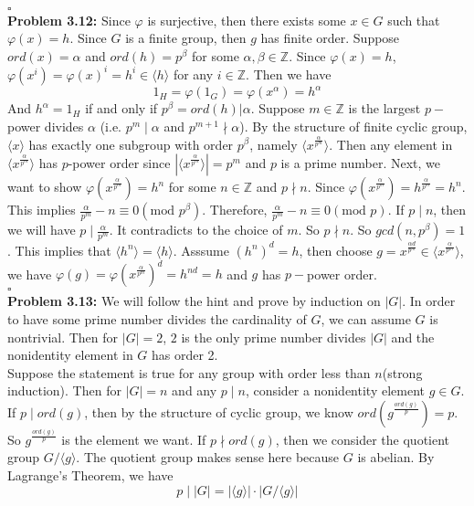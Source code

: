 \documentclass[12pt]{amsart}
\newcommand{\Z}{\mathbb{Z}}
\begin{document}
    \\\phantom{qed}\hfill$\square$\\
    \textbf{Problem 3.12:} Since $\varphi$ is surjective, then there exists some $x\in G$ such that $\varphi(x)=h$. Since $G$ is a finite group, then $g$ has finite order. Suppose $ord(x)=\alpha$ and $ord(h)=p^\beta$ for some $\alpha,\beta\in \Z$. Since $\varphi(x)=h$, $\varphi(x^i)=\varphi(x)^i=h^i\in\langle h\rangle$ for any $i\in\Z$. Then we have 
    \[1_H=\varphi(1_G)=\varphi(x^\alpha)=h^\alpha\]
    And $h^\alpha=1_H$ if and only if $p^\beta=ord(h)|\alpha$. Suppose $m\in\Z$ is the largest $p-$power divides $\alpha$ (i.e. $p^m\mid \alpha$ and $p^{m+1}\nmid \alpha$).  By the structure of finite cyclic group, $\langle x\rangle$ has exactly one subgroup with order $p^\beta$, namely $\langle x^{\frac{\alpha}{p^m}}\rangle$. Then any element in $\langle x^{\frac{\alpha}{p^m}}\rangle$ has $p$-power order since $|\langle x^{\frac{\alpha}{p^m}}\rangle|=p^m$ and $p$ is a prime number. Next, we want to show $\varphi(x^{\frac{\alpha}{p^m}})=h^n$ for some $n\in\Z$ and $p\nmid n$. Since $\varphi(x^\frac{\alpha}{p^m})=h^{\frac{\alpha}{p^m}}=h^n$. This implies $\frac{\alpha}{p^m}-n\equiv0(\text{mod }p^\beta)$. Therefore, $\frac{\alpha}{p^m}-n\equiv0(\text{mod }p)$. If $p\mid n$, then we will have $p\mid \frac{\alpha}{p^m}$. It contradicts to the choice of $m$. So $p\nmid n$. So $gcd (n,p^\beta )=1$. This implies that $\langle h^n\rangle=\langle h\rangle$. Asssume $(h^n)^d=h$, then choose $g=x^\frac{\alpha d}{p^m}\in \langle x^{\frac{\alpha}{p^m}}\rangle$, we have $\varphi(g)=\varphi(x^{\frac{\alpha}{p^m}})^d=h^{nd}=h$ and $g$ has $p-$power order.
    \\\phantom{qed}\hfill$\square$\\
    \textbf{Problem 3.13:} We will follow the hint and prove by induction on $|G|$. In order to have some prime number divides the cardinality of $G$, we can assume $G$ is nontrivial.
    Then for $|G|=2$, $2$ is the only prime number divides $|G|$ and the nonidentity element in $G$ has order 2.\\
    Suppose the statement is true for any group with order less than $n$(strong induction). Then for $|G|=n$ and any $p\mid n$, consider a nonidentity element $g\in G$. If $p\mid ord(g)$, then by the structure of cyclic group, we know $ord(g^{\frac{ord(g)}{p}})=p$. So $g^{\frac{ord(g)}{p}}$ is the element we want. If $p\nmid ord(g)$, then we consider the quotient group $G/\langle g\rangle$. The quotient group makes sense here because $G$ is abelian. By Lagrange's Theorem, we have $$p\mid |G|=|\langle g\rangle|\cdot |G/\langle g\rangle|$$
\end{document}
